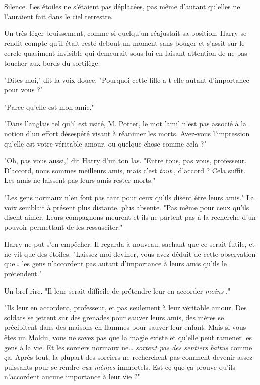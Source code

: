 Silence. Les étoiles ne s'étaient pas déplacées, pas même d'autant qu'elles ne l'auraient fait dans le ciel terrestre.

Un très léger bruissement, comme si quelqu'un réajustait sa position. Harry se rendit compte qu'il était resté debout un moment sans bouger et s'assit sur le cercle quasiment invisible qui demeurait sous lui en faisant attention de ne pas toucher aux bords du sortilège.

"Dites-moi," dit la voix douce. "Pourquoi cette fille a-t-elle autant d'importance pour vous ?"

"Parce qu'elle est mon amie."

"Dans l'anglais tel qu'il est usité, M. Potter, le mot 'ami' n'est pas associé à la notion d'un effort désespéré visant à réanimer les morts. Avez-vous l'impression qu'elle est votre véritable amour, ou quelque chose comme cela ?"

"Oh, pas vous aussi," dit Harry d'un ton las. "Entre tous, pas vous, professeur. D'accord, nous sommes meilleurs amis, mais c'est \emph{tout} , d'accord ? Cela suffit. Les amis ne laissent pas leurs amis rester morts."

"Les gens normaux n'en font pas tant pour ceux qu'ils disent être leurs amis." La voix semblait à présent plus distante, plus absente. "Pas même pour ceux qu'ils disent aimer. Leurs compagnons meurent et ils ne partent pas à la recherche d'un pouvoir permettant de les ressusciter."

Harry ne put s'en empêcher. Il regarda à nouveau, sachant que ce serait futile, et ne vit que des étoiles. "Laissez-moi deviner, vous avez déduit de cette observation que… les gens n'accordent pas autant d'importance à leurs amis qu'ils le prétendent."

Un bref rire. "Il leur serait difficile de prétendre leur en accorder \emph{moins} ."

"Ils leur en accordent, professeur, et pas seulement à leur véritable amour. Des soldats se jettent sur des grenades pour sauver leurs amis, des mères se précipitent dans des maisons en flammes pour sauver leur enfant. Mais si vous êtes un Moldu, vous ne savez pas que la magie existe et qu'elle peut ramener les gens à la vie. Et les sorciers normaux ne… \emph{sortent pas des sentiers battus}  comme ça. Après tout, la plupart des sorciers ne recherchent pas comment devenir assez puissants pour se rendre \emph{eux-mêmes}  immortels. Est-ce que ça prouve qu'ils n'accordent aucune importance à leur vie ?"

